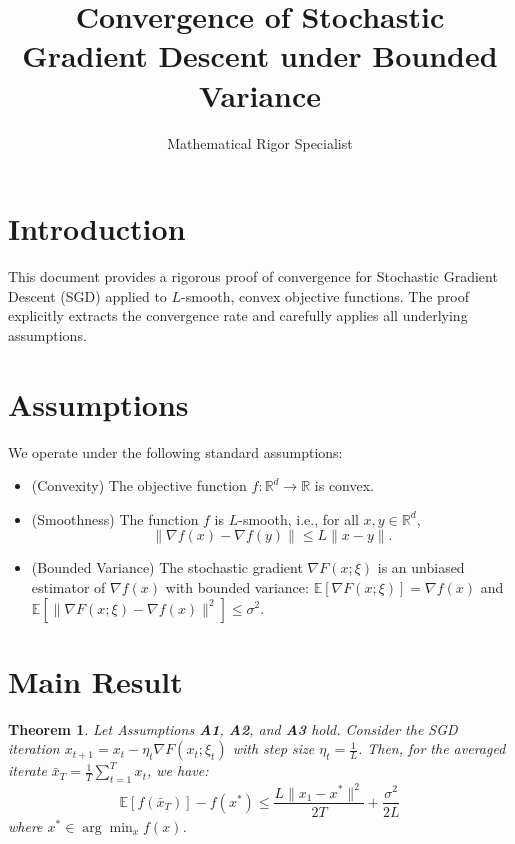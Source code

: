 \documentclass[11pt]{article}
\newtheorem{theorem}{Theorem}
\begin{document}
\title{Convergence of Stochastic Gradient Descent under Bounded Variance}
\author{Mathematical Rigor Specialist}
\date{}
\maketitle

\section{Introduction}
This document provides a rigorous proof of convergence for Stochastic Gradient Descent (SGD) applied to $L$-smooth, convex objective functions. The proof explicitly extracts the convergence rate and carefully applies all underlying assumptions.

\section{Assumptions}
We operate under the following standard assumptions:
\begin{itemize}
    \item[\textbf{A1}] (Convexity) The objective function $f: \mathbb{R}^d \to \mathbb{R}$ is convex.
    \item[\textbf{A2}] (Smoothness) The function $f$ is $L$-smooth, i.e., for all $x, y \in \mathbb{R}^d$,
    $$ \|\nabla f(x) - \nabla f(y)\| \le L \|x - y\|. $$
    \item[\textbf{A3}] (Bounded Variance) The stochastic gradient $\nabla F(x; \xi)$ is an unbiased estimator of $\nabla f(x)$ with bounded variance: $\mathbb{E}[\nabla F(x; \xi)] = \nabla f(x)$ and $\mathbb{E}[\|\nabla F(x; \xi) - \nabla f(x)\|^2] \le \sigma^2$.
\end{itemize}

\section{Main Result}

\begin{theorem}
Let Assumptions \textbf{A1}, \textbf{A2}, and \textbf{A3} hold. Consider the SGD iteration $x_{t+1} = x_t - \eta_t \nabla F(x_t; \xi_t)$ with step size $\eta_t = \frac{1}{L}$. Then, for the averaged iterate $\bar{x}_T = \frac{1}{T} \sum_{t=1}^T x_t$, we have:
$$ \mathbb{E}[f(\bar{x}_T)] - f(x^*) \le \frac{L \|x_1 - x^*\|^2}{2T} + \frac{\sigma^2}{2L} $$
where $x^* \in \arg\min_{x} f(x)$.
\end{theorem}
\end{document}

